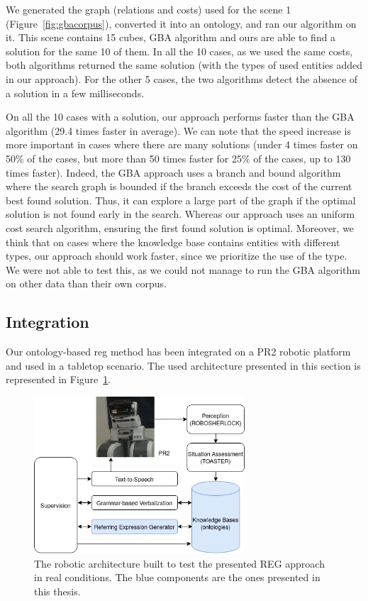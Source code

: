 \documentclass[a4paper,11pt,twoside]{StyleThese}
\begin{document}
We generated the graph (relations and costs) used for the scene 1 (Figure~\ref{fig:gbacorpus}), converted it into an ontology, and ran our algorithm on it.
This scene contains 15 cubes, GBA algorithm and ours are able to find a solution for the same 10 of them. In all the 10 cases, as we used the same costs, both algorithms returned the same solution (with the types of used entities added in our approach). 
For the other 5 cases, the two algorithms detect the absence of a solution in a few milliseconds.

On all the 10 cases with a solution, our approach performs faster than the GBA algorithm (29.4 times faster in average). We can note that the speed increase is more important in cases where there are many solutions (under 4 times faster on 50\% of the cases, but more than 50 times faster for 25\% of the cases, up to 130 times faster). 
Indeed, the GBA approach uses a branch and bound algorithm where the search graph is bounded if the branch exceeds the cost of the current best found solution. Thus, it can explore a large part of the graph if the optimal solution is not found early in the search. Whereas our approach uses an uniform cost search algorithm, ensuring the first found solution is optimal.
Moreover, we think that on cases where the knowledge base contains entities with different types, our approach should work faster, since we prioritize the use of the type. We were not able to test this, as we could not manage to run the GBA algorithm on other data than their own corpus.

\subsection{Integration}

Our ontology-based \acrshort{reg} method has been integrated on a PR2 robotic platform and used in a tabletop scenario. The used architecture presented in this section is represented in Figure~\ref{fig:regarchi}.

\begin{figure}[hbtp]
\centering
\includegraphics[width=0.7\textwidth]{figures/chapter3/ArchiREG.png}
\caption{The robotic architecture built to test the presented REG approach in real conditions. The blue components are the ones presented in this thesis.}
\label{fig:regarchi}
\end{figure}
\end{document}
